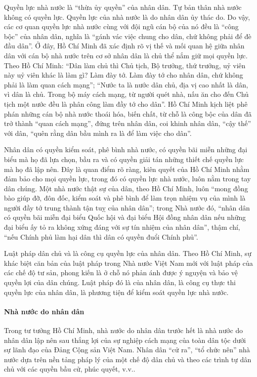 Quyền lực nhà nước là ``thừa ủy quyền'' của nhân dân. Tự bản thân nhà nước không có quyền lực. Quyền lực của nhà nước là do nhân dân ủy thác do. Do vậy, các cơ quan quyền lực nhà nước cùng với đội ngũ cán bộ của nó đều là ``công bộc'' của nhân dân, nghĩa là ``gánh vác việc chung cho dân, chứ không phải để đè đầu dân''. Ở đây, Hồ Chí Minh đã xác định rõ vị thế và mối quan hệ giữa nhân dân với cán bộ nhà nước trên cơ sở nhân dân là chủ thể nắm giữ mọi quyền lực. Theo Hồ Chí Minh: ``Dân làm chủ thì Chủ tịch, Bộ trưởng, thứ trưởng, uỷ viên này uỷ viên khác là làm gì? Làm đày tớ. Làm đày tớ cho nhân dân, chứ không phải là làm quan cách mạng''; ``Nước ta là nước dân chủ, địa vị cao nhất là dân, vì dân là chủ. Trong bộ máy cách mạng, từ người quét nhà, nấu ăn cho đến Chủ tịch một nước đều là phân công làm đầy tớ cho dân''. Hồ Chí Minh kịch liệt phê phán những cán bộ nhà nước thoái hóa, biến chất, từ chỗ là công bộc của dân đã trở thành ``quan cách mạng'', đứng trên nhân dân, coi khinh nhân dân, ``cậy thế'' với dân, ``quên rằng dân bầu mình ra là để làm việc cho dân''.

Nhân dân có quyền kiểm soát, phê bình nhà nước, có quyền bãi miễn những đại biểu mà họ đã lựa chọn, bầu ra và có quyền giải tán những thiết chế quyền lực mà họ đã lập nên. Đây là quan điểm rõ ràng, kiên quyết của Hồ Chí Minh nhằm đảm bảo cho mọi quyền lực, trong đó có quyền lực nhà nước, luôn nằm trong tay dân chúng. Một nhà nước thật sự của dân, theo Hồ Chí Minh, luôn ``mong đồng bào giúp đỡ, đôn đốc, kiểm soát và phê bình để làm trọn nhiệm vụ của mình là người đầy tớ trung thành tận tuỵ của nhân dân''; trong Nhà nước đó, ``nhân dân có quyền bãi miễn đại biểu Quốc hội và đại biểu Hội đồng nhân dân nếu những đại biểu ấy tỏ ra không xứng đáng với sự tín nhiệm của nhân dân'', thậm chí, ``nếu Chính phủ làm hại dân thì dân có quyền đuổi Chính phủ''.

Luật pháp dân chủ và là công cụ quyền lực của nhân dân. Theo Hồ Chí Minh, sự khác biệt căn bản của luật pháp trong Nhà nước Việt Nam mới với luật pháp của các chế độ tư sản, phong kiến là ở chỗ nó phản ánh được ý nguyện và bảo vệ quyền lợi của dân chúng. Luật pháp đó là của nhân dân, là công cụ thực thi quyền lực của nhân dân, là phương tiện để kiểm soát quyền lực nhà nước.

\paragraph{Nhà nước do nhân dân}
Trong tư tưởng Hồ Chí Minh, nhà nước do nhân dân trước hết là nhà nước do nhân dân lập nên sau thắng lợi của sự nghiệp cách mạng của toàn dân tộc dưới sự lãnh đạo của Đảng Cộng sản Việt Nam. Nhân dân ``cử ra'', ``tổ chức nên'' nhà nước dựa trên nền tảng pháp lý của một chế độ dân chủ và theo các trình tự dân chủ với các quyền bầu cử, phúc quyết, v.v..

